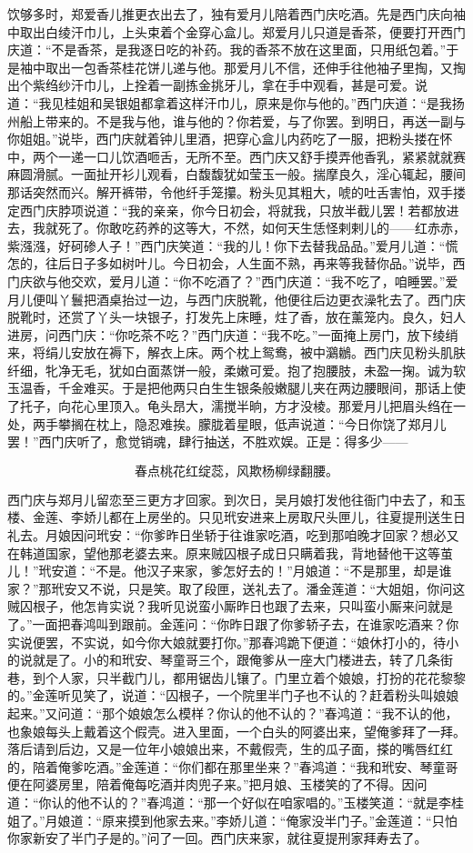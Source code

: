 饮够多时，郑爱香儿推更衣出去了，独有爱月儿陪着西门庆吃酒。先是西门庆向袖中取出白绫汗巾儿，上头束着个金穿心盒儿。郑爱月儿只道是香茶，便要打开西门庆道：“不是香茶，是我逐日吃的补药。我的香茶不放在这里面，只用纸包着。”于是袖中取出一包香茶桂花饼儿递与他。那爱月儿不信，还伸手往他袖子里掏，又掏出个紫绉纱汗巾儿，上拴着一副拣金挑牙儿，拿在手中观看，甚是可爱。说道：“我见桂姐和吴银姐都拿着这样汗巾儿，原来是你与他的。”西门庆道：“是我扬州船上带来的。不是我与他，谁与他的？你若爱，与了你罢。到明日，再送一副与你姐姐。”说毕，西门庆就着钟儿里酒，把穿心盒儿内药吃了一服，把粉头搂在怀中，两个一递一口儿饮酒咂舌，无所不至。西门庆又舒手摸弄他香乳，紧紧就就赛麻圆滑腻。一面扯开衫儿观看，白馥馥犹如莹玉一般。揣摩良久，淫心辄起，腰间那话突然而兴。解开裤带，令他纤手笼攥。粉头见其粗大，唬的吐舌害怕，双手搂定西门庆脖项说道：“我的亲亲，你今日初会，将就我，只放半截儿罢！若都放进去，我就死了。你敢吃药养的这等大，不然，如何天生恁怪剌剌儿的——红赤赤，紫漒漒，好砢碜人子！”西门庆笑道：“我的儿！你下去替我品品。”爱月儿道：“慌怎的，往后日子多如树叶儿。今日初会，人生面不熟，再来等我替你品。”说毕，西门庆欲与他交欢，爱月儿道：“你不吃酒了？”西门庆道：“我不吃了，咱睡罢。”爱月儿便叫丫鬟把酒桌抬过一边，与西门庆脱靴，他便往后边更衣澡牝去了。西门庆脱靴时，还赏了丫头一块银子，打发先上床睡，炷了香，放在薰笼内。良久，妇人进房，问西门庆：“你吃茶不吃？”西门庆道：“我不吃。”一面掩上房门，放下绫绡来，将绢儿安放在褥下，解衣上床。两个枕上鸳鸯，被中鸂鶒。西门庆见粉头肌肤纤细，牝净无毛，犹如白面蒸饼一般，柔嫩可爱。抱了抱腰肢，未盈一掬。诚为软玉温香，千金难买。于是把他两只白生生银条般嫩腿儿夹在两边腰眼间，那话上使了托子，向花心里顶入。龟头昂大，濡搅半晌，方才没棱。那爱月儿把眉头绉在一处，两手攀搁在枕上，隐忍难挨。朦胧着星眼，低声说道：“今日你饶了郑月儿罢！”西门庆听了，愈觉销魂，肆行抽送，不胜欢娱。正是：得多少——

\[
春点桃花红绽蕊，风欺杨柳绿翻腰。
\]

西门庆与郑月儿留恋至三更方才回家。到次日，吴月娘打发他往衙门中去了，和玉楼、金莲、李娇儿都在上房坐的。只见玳安进来上房取尺头匣儿，往夏提刑送生日礼去。月娘因问玳安：“你爹昨日坐轿于往谁家吃酒，吃到那咱晚才回家？想必又在韩道国家，望他那老婆去来。原来贼囚根子成日只瞒着我，背地替他干这等茧儿！”玳安道：“不是。他汉子来家，爹怎好去的！”月娘道：“不是那里，却是谁家？”那玳安又不说，只是笑。取了段匣，送礼去了。潘金莲道：“大姐姐，你问这贼囚根子，他怎肯实说？我听见说蛮小厮昨日也跟了去来，只叫蛮小厮来问就是了。”一面把春鸿叫到跟前。金莲问：“你昨日跟了你爹轿子去，在谁家吃酒来？你实说便罢，不实说，如今你大娘就要打你。”那春鸿跪下便道：“娘休打小的，待小的说就是了。小的和玳安、琴童哥三个，跟俺爹从一座大门楼进去，转了几条街巷，到个人家，只半截门儿，都用锯齿儿镶了。门里立着个娘娘，打扮的花花黎黎的。”金莲听见笑了，说道：“囚根子，一个院里半门子也不认的？赶着粉头叫娘娘起来。”又问道：“那个娘娘怎么模样？你认的他不认的？”春鸿道：“我不认的他，也象娘每头上戴着这个假壳。进入里面，一个白头的阿婆出来，望俺爹拜了一拜。落后请到后边，又是一位年小娘娘出来，不戴假壳，生的瓜子面，搽的嘴唇红红的，陪着俺爹吃酒。”金莲道：“你们都在那里坐来？”春鸿道：“我和玳安、琴童哥便在阿婆房里，陪着俺每吃酒并肉兜子来。”把月娘、玉楼笑的了不得。因问道：“你认的他不认的？”春鸿道：“那一个好似在咱家唱的。”玉楼笑道：“就是李桂姐了。”月娘道：“原来摸到他家去来。”李娇儿道：“俺家没半门子。”金莲道：“只怕你家新安了半门子是的。”问了一回。西门庆来家，就往夏提刑家拜寿去了。


